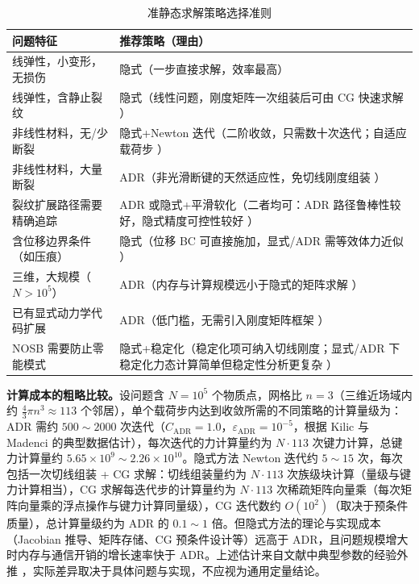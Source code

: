 \begin{table}[htbp]
  \centering
  \small
  \caption{准静态求解策略选择准则}
  \label{tab:qs-comparison}
  \begin{tabular}{>{\raggedright\arraybackslash}p{}>{\raggedright\arraybackslash}p{}}
    \toprule
    问题特征 & 推荐策略（理由） \\
    \midrule
    线弹性，小变形，无损伤 & 隐式（一步直接求解，效率最高） \\
    线弹性，含静止裂纹 & 隐式（线性问题，刚度矩阵一次组装后可由 CG 快速求解 \cite{Breitenfeld2014}） \\
    非线性材料，无/少断裂 & 隐式+Newton 迭代（二阶收敛，只需数十次迭代；自适应载荷步 \cite{Hashim2020}） \\
    非线性材料，大量断裂 & ADR（非光滑断键的天然适应性，免切线刚度组装 \cite{KilicMadenci2010}） \\
    裂纹扩展路径需要精确追踪 & ADR 或隐式+平滑软化（二者均可：ADR 路径鲁棒性较好，隐式精度可控性较好 \cite{Ni2019}） \\
    含位移边界条件（如压痕） & 隐式（位移 BC 可直接施加，显式/ADR 需等效体力近似 \cite{Breitenfeld2014}） \\
    三维，大规模（$N>10^{5}$） & ADR（内存与计算规模远小于隐式的矩阵求解 \cite{MadenciOterkus2014}） \\
    已有显式动力学代码扩展 & ADR（低门槛，无需引入刚度矩阵框架 \cite{KilicMadenci2010}） \\
    NOSB 需要防止零能模式 & 隐式+稳定化（稳定化项可纳入切线刚度；显式/ADR 下稳定化力态计算简单但稳定性分析更复杂 \cite{Hashim2020}） \\
    \bottomrule
  \end{tabular}
\end{table}

\textbf{计算成本的粗略比较。}设问题含 $N=10^{5}$ 个物质点，网格比 $n=3$（三维近场域内约 $\frac{4}{3}\pi n^{3}\approx113$ 个邻居），单个载荷步内达到收敛所需的不同策略的计算量级为：ADR 需约 $500\sim2000$ 次迭代（$C_{\text{ADR}}=1.0$，$\varepsilon_{\text{ADR}}=10^{-5}$，根据 Kilic 与 Madenci \cite{KilicMadenci2010} 的典型数据估计），每次迭代的力计算量约为 $N\cdot 113$ 次键力计算，总键力计算量约 $5.65\times10^{9}\sim2.26\times10^{10}$。隐式方法 Newton 迭代约 $5\sim15$ 次，每次包括一次切线组装 + CG 求解：切线组装量约为 $N\cdot 113$ 次族级块计算（量级与键力计算相当），CG 求解每迭代步的计算量约为 $N\cdot 113$ 次稀疏矩阵向量乘（每次矩阵向量乘的浮点操作与键力计算同量级），CG 迭代数约 $O(10^{2})$（取决于预条件质量），总计算量级约为 ADR 的 $0.1\sim1$ 倍。但隐式方法的理论与实现成本（Jacobian 推导、矩阵存储、CG 预条件设计等）远高于 ADR，且问题规模增大时内存与通信开销的增长速率快于 ADR。上述估计来自文献中典型参数的经验外推 \cite{Breitenfeld2014,KilicMadenci2010,Ni2019}，实际差异取决于具体问题与实现，不应视为通用定量结论。


